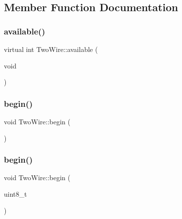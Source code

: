 \subsection{Member Function Documentation}
\mbox{\label{class_two_wire_a2fa9c43179d08d953f199fe82d0536d9}} 
\subsubsection{\texorpdfstring{available()}{available()}}
{\footnotesize\ttfamily virtual int Two\+Wire\+::available (\begin{DoxyParamCaption}\item[{void}]{ }\end{DoxyParamCaption})\hspace{0.3cm}{\ttfamily [virtual]}}

\mbox{\label{class_two_wire_ada85a7a8663ec8af0a1248b659be2f18}} 
\subsubsection{\texorpdfstring{begin()}{begin()}\hspace{0.1cm}{\footnotesize\ttfamily [1/3]}}
{\footnotesize\ttfamily void Two\+Wire\+::begin (\begin{DoxyParamCaption}{ }\end{DoxyParamCaption})}

\mbox{\label{class_two_wire_a28bca087ed188781ef15e72622d3b1fb}} 
\subsubsection{\texorpdfstring{begin()}{begin()}\hspace{0.1cm}{\footnotesize\ttfamily [2/3]}}
{\footnotesize\ttfamily void Two\+Wire\+::begin (\begin{DoxyParamCaption}\item[{uint8\+\_\+t}]{ }\end{DoxyParamCaption})}

\mbox{\label{class_two_wire_a2806aa5684d36d7d20bf7c51cab3e602}} 
